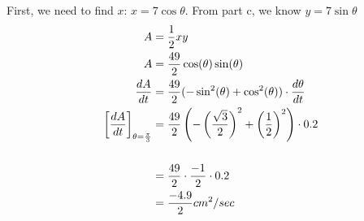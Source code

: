 \documentclass[nooutcomes,handout]{ximera}
\begin{document}
\begin{problem}
\begin{enumerate}
		\begin{freeResponse}
		First, we need to find $x$: $x=7 \cos{\theta}$.  From part c, we know $y=7\sin{\theta}$
		\begin{align*}
		A&=\frac{1}{2}xy\\
		A&=\frac{49}{2}\cos(\theta)\sin(\theta)\\
		\frac{dA}{dt}&=\frac{49}{2}(-\sin^2(\theta)+\cos^2(\theta)) \cdot \frac{d\theta}{dt}\\
		\bigg[ \frac{dA}{dt} \bigg]_{\theta=\frac{\pi}{3}}&=\frac{49}{2}\left(-\left(\frac{\sqrt{3}}{2}\right)^2+\left(\frac{1}{2}\right)^2 \right) \cdot 0.2\\\\
		&=\frac{49}{2}\cdot \frac{-1}{2} \cdot 0.2\\
		&=\frac{-4.9}{2} cm^2/sec
		\end{align*}
		\end{freeResponse}
\end{enumerate}
\end{problem}
\end{document}
